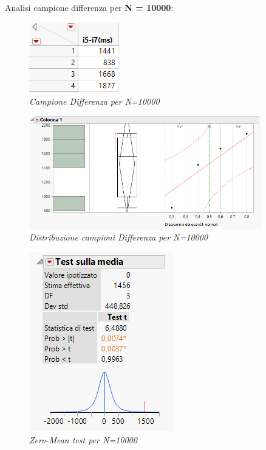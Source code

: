 Analisi campione differenza per \textbf{N = 10000}:
\begin{figure}[H]
	\centering
	\includegraphics{img/hw0/diff2.png}
	\caption{\textit{Campione Differenza per N=10000}}
\end{figure}
\begin{figure}[H]
	\centering
	\includegraphics[width=0.9\textwidth]{img/hw0/statistiche10000.png}
	\caption{\textit{Distribuzione campioni Differenza per N=10000}}
\end{figure}
\begin{figure}[H]
	\centering
	\includegraphics{img/hw0/test10000.png}
	\caption{\textit{Zero-Mean test per N=10000}}
\end{figure}

